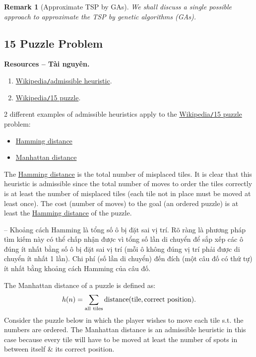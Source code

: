 \documentclass{article}
\newtheorem{remark}{Remark}
\begin{document}
\begin{remark}[Approximate TSP by GAs]
	We shall discuss a single possible approach to approximate the TSP by genetic algorithms (GAs).
\end{remark}


\subsection{15 Puzzle Problem}
\textbf{\textbf{Resources -- Tài nguyên.}}
\begin{enumerate}
	\item \href{https://en.wikipedia.org/wiki/Admissible_heuristic}{Wikipedia{\tt/}admissible heuristic}.
	\item \href{https://en.wikipedia.org/wiki/Fifteen_puzzle}{Wikipedia{\tt/}15 puzzle}.
\end{enumerate}
2 different examples of admissible heuristics apply to the \href{https://en.wikipedia.org/wiki/Fifteen_puzzle}{Wikipedia{\tt/}15 puzzle} problem:
\begin{itemize}
	\item \href{https://en.wikipedia.org/wiki/Hamming_distance}{Hamming distance}
	\item \href{https://en.wikipedia.org/wiki/Manhattan_distance}{Manhattan distance}
\end{itemize}
The \href{https://en.wikipedia.org/wiki/Hamming_distance}{Hamming distance} is the total number of misplaced tiles. It is clear that this heuristic is admissible since the total number of moves to order the tiles correctly is at least the number of misplaced tiles (each tile not in place must be moved at least once). The cost (number of moves) to the goal (an ordered puzzle) is at least the \href{https://en.wikipedia.org/wiki/Hamming_distance}{Hamming distance} of the puzzle.

-- Khoảng cách Hamming là tổng số ô bị đặt sai vị trí. Rõ ràng là phương pháp tìm kiếm này có thể chấp nhận được vì tổng số lần di chuyển để sắp xếp các ô đúng ít nhất bằng số ô bị đặt sai vị trí (mỗi ô không đúng vị trí phải được di chuyển ít nhất 1 lần). Chi phí (số lần di chuyển) đến đích (một câu đố có thứ tự) ít nhất bằng khoảng cách Hamming của câu đố.

The Manhattan distance of a puzzle is defined as:
\begin{equation*}
	h(n) = \sum_{\rm all\ tiles} {\rm distance}(\mbox{tile},\mbox{correct position}).
\end{equation*}
Consider the puzzle below in which the player wishes to move each tile s.t. the numbers are ordered. The Manhattan distance is an admissible heuristic in this case because every tile will have to be moved at least the number of spots in between itself \& its correct position.
\end{document}
